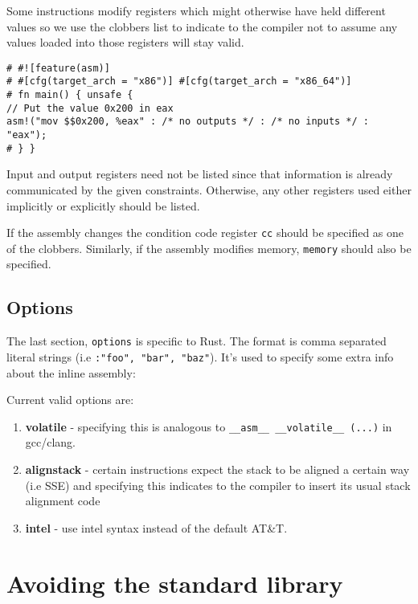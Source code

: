 \documentclass[]{article}
\begin{document}
Some instructions modify registers which might otherwise have held
different values so we use the clobbers list to indicate to the compiler
not to assume any values loaded into those registers will stay valid.

\begin{verbatim}
# #![feature(asm)]
# #[cfg(target_arch = "x86")] #[cfg(target_arch = "x86_64")]
# fn main() { unsafe {
// Put the value 0x200 in eax
asm!("mov $$0x200, %eax" : /* no outputs */ : /* no inputs */ : "eax");
# } }
\end{verbatim}

Input and output registers need not be listed since that information is
already communicated by the given constraints. Otherwise, any other
registers used either implicitly or explicitly should be listed.

If the assembly changes the condition code register \texttt{cc} should
be specified as one of the clobbers. Similarly, if the assembly modifies
memory, \texttt{memory} should also be specified.

\subsection{Options}\label{options}

The last section, \texttt{options} is specific to Rust. The format is
comma separated literal strings (i.e \texttt{:"foo", "bar", "baz"}).
It's used to specify some extra info about the inline assembly:

Current valid options are:

\begin{enumerate}
\def\labelenumi{\arabic{enumi}.}
\itemsep1pt\parskip0pt
\item
  \textbf{volatile} - specifying this is analogous to
  \texttt{\_\_asm\_\_ \_\_volatile\_\_ (...)} in gcc/clang.
\item
  \textbf{alignstack} - certain instructions expect the stack to be
  aligned a certain way (i.e SSE) and specifying this indicates to the
  compiler to insert its usual stack alignment code
\item
  \textbf{intel} - use intel syntax instead of the default AT\&T.
\end{enumerate}

\section{Avoiding the standard
library}\label{avoiding-the-standard-library}
\end{document}
